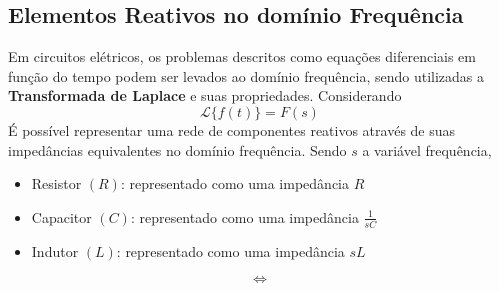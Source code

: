 \documentclass{article}
\numberwithin{equation}{section}
\newlength\Colsep
\let\dfr\dfrac
\begin{document}

\subsection{Elementos Reativos no domínio Frequência}
\label{subesc:frequencia}
Em circuitos elétricos, os problemas descritos como equações diferenciais em função do tempo podem ser levados ao domínio frequência, sendo utilizadas a \textbf{Transformada de Laplace} e suas propriedades. Considerando
$$\mathscr{L}\{f(t)\}=F(s)$$
É possível representar uma rede de componentes reativos através de suas impedâncias equivalentes no domínio frequência. Sendo $s$ a variável frequência,

\begin{itemize}
    \item Resistor $(R)$: representado como uma impedância $R$
    \item Capacitor $(C)$: representado como uma impedância $\displaystyle{\frac{1}{sC}}$
    \item Indutor $(L)$: representado como uma impedância $sL$
\end{itemize}
%
\noindent\begin{minipage}{\textwidth}
\centering
\begin{minipage}[c][5cm][c]{\dimexpr0.45\textwidth-0.5\Colsep\relax}
    \begin{center}
    \end{center}
\end{minipage} \hfill
\begin{minipage}[c][5cm][c]{\dimexpr0.1\textwidth-0.5\Colsep\relax}
    $$\iff$$
\end{minipage} \hfill
\begin{minipage}[c][5cm][c]{\dimexpr0.45\textwidth-0.5\Colsep\relax}
    \begin{center}
    \end{center}
\end{minipage}
\end{minipage}
\end{document}
